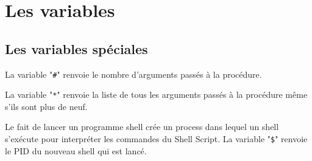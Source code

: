 %
%

\setcounter{remarque-cnt}{1}
\setcounter{example-cnt}{1}
\chapter{Les variables}

\section{\label{variables-special-var}Les variables sp{\'e}ciales}

La variable "\verb=#="  renvoie le
nombre d'arguments pass{\'e}s {\`a} la proc{\'e}dure.

La variable "\verb=*=" renvoie la liste
de tous les arguments pass{\'e}s {\`a} la proc{\'e}dure m{\^e}me s'ils
sont plus de neuf.

Le fait de lancer un programme shell cr{\'e}e un process dans lequel un
shell s'ex{\'e}cute pour interpr{\'e}ter les commandes du Shell Script.
La variable "\verb=$=" renvoie le PID
du nouveau shell qui est lanc{\'e}.

